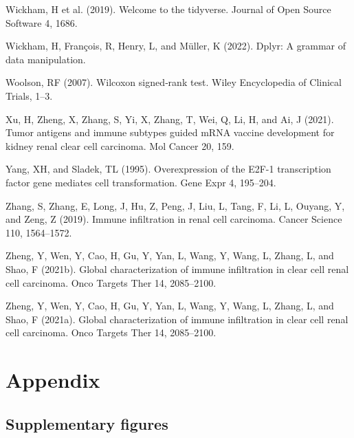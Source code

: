 \documentclass[
  parskip,
  openany]{scrreprt}
\newlength{\cslhangindent}
\newlength{\cslentryspacingunit} %
\newenvironment{CSLReferences}[2] %
 {%
  \setlength{\parindent}{0pt}
  \ifodd #1
  \let\oldpar\par
  \def\par{\hangindent=\cslhangindent\oldpar}
  \fi
  \setlength{\parskip}{#2\cslentryspacingunit}
 }%
 {}
\begin{document}
\begin{CSLReferences}{0}{0}
\leavevmode{}%
Wickham, H et al. (2019). Welcome to the {tidyverse}. Journal of Open
Source Software 4, 1686.

\leavevmode{}%
Wickham, H, François, R, Henry, L, and Müller, K (2022). Dplyr: A
grammar of data manipulation.

\leavevmode{}%
Woolson, RF (2007). Wilcoxon signed‐rank test. Wiley Encyclopedia of
Clinical Trials, 1--3.

\leavevmode{}%
Xu, H, Zheng, X, Zhang, S, Yi, X, Zhang, T, Wei, Q, Li, H, and Ai, J
(2021). Tumor antigens and immune subtypes guided mRNA vaccine
development for kidney renal clear cell carcinoma. Mol Cancer 20, 159.

\leavevmode{}%
Yang, XH, and Sladek, TL (1995). Overexpression of the E2F-1
transcription factor gene mediates cell transformation. Gene Expr 4,
195--204.

\leavevmode{}%
Zhang, S, Zhang, E, Long, J, Hu, Z, Peng, J, Liu, L, Tang, F, Li, L,
Ouyang, Y, and Zeng, Z (2019). Immune infiltration in renal cell
carcinoma. Cancer Science 110, 1564--1572.

\leavevmode{}%
Zheng, Y, Wen, Y, Cao, H, Gu, Y, Yan, L, Wang, Y, Wang, L, Zhang, L, and
Shao, F (2021b). Global characterization of immune infiltration in clear
cell renal cell carcinoma. Onco Targets Ther 14, 2085--2100.

\leavevmode{}%
Zheng, Y, Wen, Y, Cao, H, Gu, Y, Yan, L, Wang, Y, Wang, L, Zhang, L, and
Shao, F (2021a). Global characterization of immune infiltration in clear
cell renal cell carcinoma. Onco Targets Ther 14, 2085--2100.

\end{CSLReferences}

\hypertarget{appendix}{%
\chapter{Appendix}\label{appendix}}

\hypertarget{supplementary-figures}{%
\section{Supplementary figures}\label{supplementary-figures}}
\end{document}
